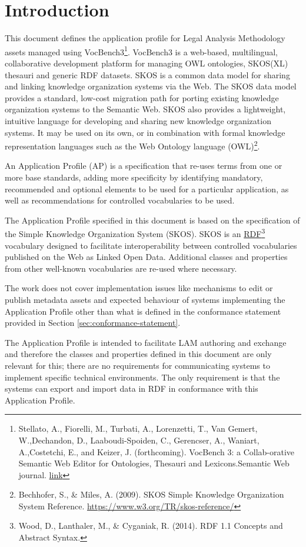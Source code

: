 \section{Introduction}
\label{ariaid-title1}

This document defines the application profile for Legal Analysis
Methodology assets managed using
VocBench3\footnote{Stellato, A., Fiorelli,
	M., Turbati, A., Lorenzetti, T., Van Gemert, W.,Dechandon, D.,
	Laaboudi-Spoiden, C., Gerencser, A., Waniart, A.,Costetchi, E., and
	Keizer, J. (forthcoming). VocBench 3: a Collab-orative Semantic Web
	Editor for Ontologies, Thesauri and Lexicons.Semantic Web journal.
	\href{http://www.semantic-web-journal.net/content/vocbench-3-collaborative-semantic-web-editor-ontologies-thesauri-and-lexicons-1}{link}}. VocBench3 is
a web-based, multilingual, collaborative development platform for
managing OWL ontologies, SKOS(XL) thesauri and generic RDF datasets.
SKOS is a common data model for sharing and linking knowledge
organization systems via the Web. The SKOS data model provides a
standard, low-cost migration path for porting existing knowledge
organization systems to the Semantic Web. SKOS also provides a
lightweight, intuitive language for developing and sharing new knowledge
organization systems. It may be used on its own, or in combination with
formal knowledge representation languages such as the Web Ontology
language (OWL)\footnote{Bechhofer, S., \&
	Miles, A. (2009). SKOS Simple Knowledge Organization System Reference.
	\mbox{\url{https://www.w3.org/TR/skos-reference/}} }.

An Application Profile (AP) is a specification that re-uses terms from
one or more base standards, adding more specificity by identifying
mandatory, recommended and optional elements to be used for a particular
application, as well as recommendations for controlled vocabularies to
be used.

The Application Profile specified in this document is based on the specification of the Simple Knowledge Organization System (SKOS). SKOS is an \href{https://www.w3.org/TR/rdf11-concepts/}{RDF}\footnote{Wood, D., Lanthaler,
	M., \& Cyganiak, R. (2014). RDF 1.1 Concepts and Abstract Syntax.} vocabulary designed to facilitate interoperability between controlled vocabularies published on the Web as Linked Open Data. Additional classes and properties from other well-known vocabularies are re-used where necessary.

The work does not cover implementation issues like mechanisms to edit or publish metadata assets and expected behaviour of systems implementing the Application Profile other than what is defined in the conformance statement provided in Section \ref{sec:conformance-statement}.

The Application Profile is intended to facilitate LAM authoring and exchange and  therefore the classes and properties defined in this document are only relevant for this; there are no requirements for communicating systems to implement specific technical environments. The only requirement is that the systems can export and import data in RDF in conformance with this Application Profile.



